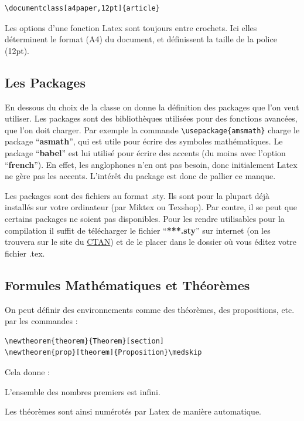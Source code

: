 \documentclass[a4paper,10pt]{article}
\begin{document}
\begin{lstlisting}
\documentclass[a4paper,12pt]{article}
\end{lstlisting}

Les options d'une fonction Latex sont toujours entre crochets. Ici elles déterminent le format (A4) du document, et définissent la taille de la police (12pt).\medskip


\subsection{Les Packages}

En dessous du choix de la classe on donne la définition des packages que l'on veut utiliser. Les packages sont des bibliothèques utilisées pour des fonctions avancées, que l'on doit charger. Par exemple la commande  \lstinline+\usepackage{amsmath}+ charge le package ``\textbf{asmath}'', qui est utile  pour écrire des symboles mathématiques. Le package ``\textbf{babel}''  est lui utilisé pour écrire des accents (du moins avec l'option ``\textbf{french}''). En effet, les anglophones n'en ont pas besoin, donc initialement Latex ne gère pas les accents. L'intérêt du package est donc de pallier ce manque. \medskip

Les packages sont des fichiers au format .sty. Ils sont pour la plupart déjà installés sur votre ordinateur (par Miktex ou Texshop). Par contre, il se peut que certains packages ne soient pas disponibles.  Pour les rendre utilisables pour la compilation il suffit de télécharger le fichier ``\textbf{***.sty}''  sur internet (on les trouvera sur le site du  \href{http://www.ctan.org/}{CTAN})  et de le placer dans le dossier où vous éditez votre fichier .tex.     \medskip

\subsection{Formules Mathématiques et Théorèmes}
On peut définir des environnements comme des théorèmes, des propositions, etc. par les commandes :\medskip
\begin{lstlisting}
\newtheorem{theorem}{Theorem}[section] 
\newtheorem{prop}[theorem]{Proposition}\medskip
\end{lstlisting}
Cela donne :

\begin{theorem}
 L'ensemble des nombres premiers est infini.
\end{theorem}
Les théorèmes  sont ainsi numérotés par Latex de manière automatique.
\end{document}
